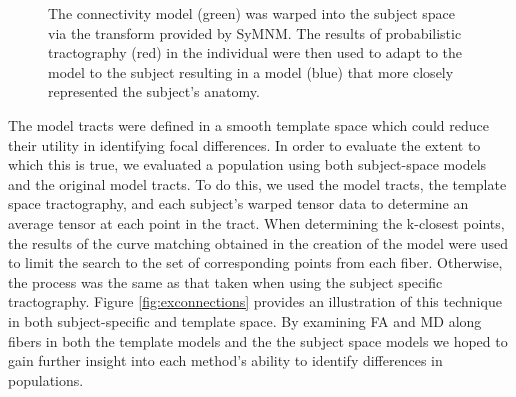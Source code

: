 \begin{figure}
\caption{The connectivity model (green) was warped into the subject space via the transform provided by SyMNM. The results of probabilistic tractography (red) in the individual were then used to adapt to the model to the subject resulting in a model (blue) that more closely represented the subject's anatomy.}
\label{fig:fitting}
\end{figure}

The model tracts were defined in a smooth template space which could reduce their utility in identifying focal differences. In order to evaluate the extent to which this is true, we evaluated a population using both subject-space models and the original model tracts. To do this, we used the model tracts, the template space tractography, and each subject's warped tensor data to determine an average tensor at each point in the tract. When determining the k-closest points, the results of the curve matching obtained in the creation of the model were used to limit the search to the set of corresponding points from each fiber. Otherwise, the process was the same as that taken when using the subject specific tractography. Figure \ref{fig:exconnections} provides an illustration of this technique in both subject-specific and template space. By examining FA and MD along fibers in both the template models and the the subject space models we hoped to gain further insight into each method's ability to identify differences in populations.

